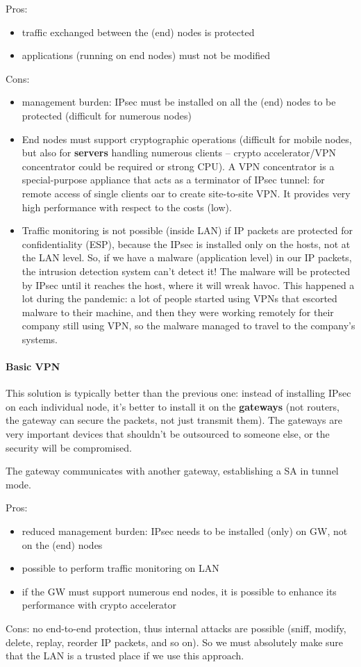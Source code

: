 Pros:
\begin{itemize}
    \item traffic exchanged between the (end) nodes is protected
    \item applications (running on end nodes) must not be modified
\end{itemize}
Cons:
\begin{itemize}
    \item management burden: IPsec must be installed on all the (end) nodes to be protected (difficult for numerous nodes)

    \item End nodes must support cryptographic operations (difficult for mobile nodes, but also for \textbf{servers} handling numerous clients – crypto accelerator/VPN concentrator could be required or strong CPU). A VPN concentrator is a special-purpose appliance that acts as a terminator of IPsec tunnel: for remote access of single clients oar to create site-to-site VPN. It provides very high performance with respect to the costs (low).

    \item Traffic monitoring is not possible (inside LAN) if IP packets are protected for confidentiality (ESP), because the IPsec is installed only on the hosts, not at the LAN level. So, if we have a malware (application level) in our IP packets, the intrusion detection system can't detect it! The malware will be protected by IPsec until it reaches the host, where it will wreak havoc. This happened a lot during the pandemic: a lot of people started using VPNs that escorted malware to their machine, and then they were working remotely for their company still using VPN, so the malware managed to travel to the company's systems.
\end{itemize}

\paragraph{Basic VPN}
This solution is typically better than the previous one: instead of installing IPsec on each individual node, it's better to install it on the \textbf{gateways} (not routers, the gateway can secure the packets, not just transmit them). The gateways are very important devices that shouldn't be outsourced to someone else, or the security will be compromised.

The gateway communicates with another gateway, establishing a SA in tunnel mode.

Pros:
\begin{itemize}
    \item reduced management burden: IPsec needs to be installed (only) on GW, not on the (end) nodes
    \item possible to perform traffic monitoring on LAN
    \item if the GW must support numerous end nodes, it is possible to enhance its performance with crypto accelerator
\end{itemize}
Cons: no end-to-end protection, thus internal attacks are possible (sniff,
modify, delete, replay, reorder IP packets, and so on). So we must absolutely make sure that the LAN is a trusted place if we use this approach.


